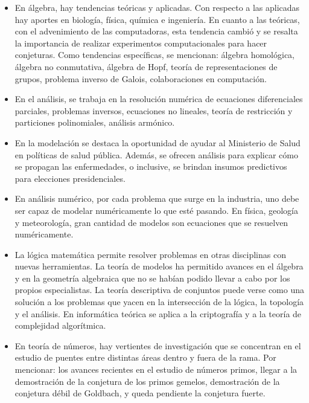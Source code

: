 \begin{itemize}
    
    \color{blue} \item \color{black}En álgebra, hay tendencias teóricas y aplicadas. Con respecto a las aplicadas hay aportes en biología, física, química e ingeniería. En cuanto a las teóricas, con el advenimiento de las computadoras, esta tendencia cambió y se resalta la importancia de realizar experimentos computacionales para hacer conjeturas. Como tendencias específicas, se mencionan: álgebra homológica, álgebra no conmutativa, álgebra de Hopf, teoría de representaciones de grupos, problema inverso de Galois, colaboraciones en computación. 

    
     \color{blue} \item \color{black} En el análisis, se trabaja en la resolución numérica de ecuaciones diferenciales parciales, problemas inversos, ecuaciones no lineales, teoría de restricción y particiones polinomiales, análisis armónico. 
     
    \color{blue} \item \color{black}  En la modelación se destaca la oportunidad de ayudar al Ministerio de Salud en políticas de salud pública. Además, se ofrecen análisis para explicar cómo se propagan las enfermedades, o inclusive, se brindan insumos predictivos para elecciones presidenciales. 
    
     \color{blue} \item \color{black} En análisis numérico, por cada problema que surge en la industria, uno debe ser capaz de modelar numéricamente lo que esté pasando. En física, geología y meteorología, gran cantidad de modelos son ecuaciones que se resuelven numéricamente. 
     
     \color{blue} \item \color{black} La lógica matemática permite resolver problemas en otras disciplinas con nuevas herramientas. La teoría de modelos ha permitido avances en el álgebra y en la geometría algebraica que no se habían podido llevar a cabo por los propios especialistas. La teoría descriptiva de conjuntos puede verse como una solución a los problemas que yacen en la intersección de la lógica, la topología y el análisis. En informática teórica se aplica a la criptografía y a la teoría de complejidad algorítmica.
     
     \color{blue} \item \color{black} En teoría de números, hay vertientes de investigación que se concentran en el estudio de puentes entre distintas áreas dentro y fuera de la rama. Por mencionar: los avances recientes en el estudio de números primos, llegar a la demostración de la conjetura de los primos gemelos, demostración de la conjetura débil de Goldbach, y queda pendiente la conjetura fuerte.  
     

\end{itemize}
